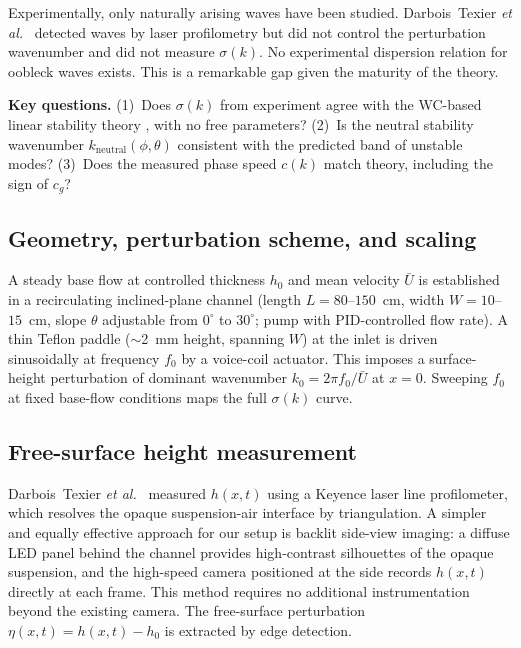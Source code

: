 \documentclass[aps,preprint,superscriptaddress,longbibliography]{revtex4-2}
\begin{document}
Experimentally, only naturally arising waves have been studied.  Darbois~Texier
\textit{et al.}~\cite{DarboisTexier2020} detected waves by laser profilometry but
did not control the perturbation wavenumber and did not measure $\sigma(k)$.
No experimental dispersion relation for oobleck waves exists.  This is a
remarkable gap given the maturity of the theory.

\begin{mdframed}[style=questionbox]
\textbf{Key questions.}
(1)~Does $\sigma(k)$ from experiment agree with the WC-based linear stability
theory \cite{DarboisTexier2023}, with no free parameters?
(2)~Is the neutral stability wavenumber $k_\text{neutral}(\phi,\theta)$
consistent with the predicted band of unstable modes?
(3)~Does the measured phase speed $c(k)$ match theory, including the sign
of $c_g$?
\end{mdframed}

\subsection{Geometry, perturbation scheme, and scaling}

A steady base flow at controlled thickness $h_0$ and mean velocity $\bar{U}$
is established in a recirculating inclined-plane channel (length $L = 80$--$150$~cm,
width $W = 10$--$15$~cm, slope $\theta$ adjustable from $0^\circ$ to $30^\circ$;
pump with PID-controlled flow rate).  A thin Teflon paddle ($\sim$2~mm height,
spanning $W$) at the inlet is driven sinusoidally at frequency $f_0$ by a
voice-coil actuator.  This imposes a surface-height perturbation of dominant
wavenumber $k_0 = 2\pi f_0/\bar{U}$ at $x = 0$.  Sweeping $f_0$ at fixed
base-flow conditions maps the full $\sigma(k)$ curve.

\subsection{Free-surface height measurement}

Darbois~Texier \textit{et al.}~\cite{DarboisTexier2020} measured $h(x,t)$
using a Keyence laser line profilometer, which resolves the opaque
suspension-air interface by triangulation.  A simpler and equally
effective approach for our setup is backlit side-view imaging: a diffuse
LED panel behind the channel provides high-contrast silhouettes of the
opaque suspension, and the high-speed camera positioned at the side records
$h(x,t)$ directly at each frame.  This method requires no additional
instrumentation beyond the existing camera.  The free-surface perturbation
$\eta(x,t) = h(x,t) - h_0$ is extracted by edge detection.
\end{document}
